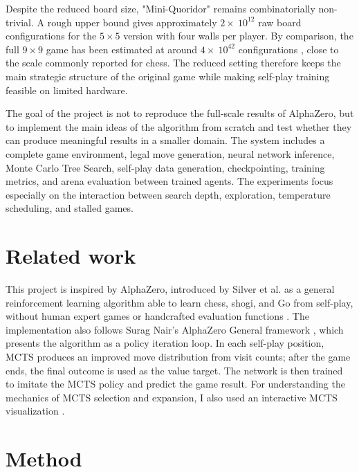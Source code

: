 \documentclass{article}
\begin{document}
Despite the reduced board size, "Mini-Quoridor" remains combinatorially
non-trivial. A rough upper bound gives approximately \(2 \times\ 10^{12}\) raw board configurations for
the \(5 \times 5\) version with four walls per player. By comparison, the full
\(9 \times 9\) game has been estimated at around \(4 \times\ 10^{42}\) configurations \cite{mertens2006quoridor}, close to
the scale commonly reported for chess. The reduced setting therefore keeps the
main strategic structure of the original game while making self-play training
feasible on limited hardware.

The goal of the project is not to reproduce the full-scale results of AlphaZero, but to implement the main ideas of the algorithm from scratch and test whether they can produce meaningful results in a smaller domain. The system includes a complete game environment, legal move generation, neural network inference, Monte Carlo Tree Search, self-play data generation, checkpointing, training metrics, and arena evaluation between trained agents. The experiments focus especially on the interaction between search depth, exploration, temperature scheduling, and stalled games.


\section{Related work}

This project is inspired by AlphaZero, introduced by Silver et al. as a general reinforcement learning algorithm able to learn chess, shogi, and Go from self-play, without human expert games or handcrafted evaluation functions \cite{silver2017alphazero}. The implementation also follows Surag Nair's AlphaZero General framework \cite{simpleAlpha}, which presents the algorithm as a policy iteration loop. In each self-play position, MCTS produces an improved move distribution from visit counts; after the game ends, the final outcome is used as the value target. The network is then trained to imitate the MCTS policy and predict the game result. For understanding the mechanics of MCTS selection and expansion, I also used an interactive MCTS visualization \cite{tictactoeMCTS}.

\section{Method}
\end{document}
